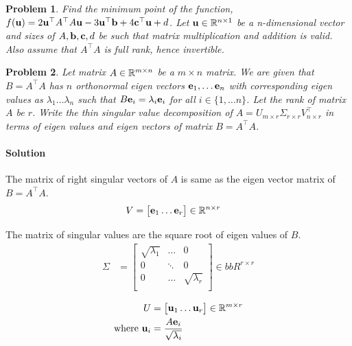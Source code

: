 \documentclass{article}
\newtheorem{prob}{Problem}
\begin{document}
\begin{prob}
  Find the minimum point of the function, $f(\mathbf{u}) = 2 \mathbf{u}^\top A^\top A \mathbf{u} - 3 \mathbf{u}^\top\mathbf{b} +
  4 \mathbf{c}^\top \mathbf{u} + d$. Let $\mathbf{u} \in \mathbb{R}^{n \times 1}$ be a n-dimensional vector and sizes of $A, \mathbf{b}, \mathbf{c}, d$
  be such that matrix multiplication and addition is valid. Also assume that $A^\top A$  is
  full rank, hence invertible.
\end{prob}

\newpage
\begin{prob}
  Let matrix $A \in \mathbb{R}^{m \times n}$ be a $m \times n$ matrix. We are given
  that $B = A^\top A$ has $n$ orthonormal eigen vectors $\mathbf{e}_1, \dots \mathbf{e}_n$ with
  corresponding eigen values as $\lambda_1 \dots \lambda_n$ such that $B\mathbf{e}_i =
  \lambda_i \mathbf{e}_i$ for all $i \in \{1, \dots n\}$. Let the rank of
  matrix $A$ be $r$. Write the thin singular
  value decomposition of $A = U_{m \times r} \Sigma_{r \times r} V^\top_{n
    \times r}$  in terms of eigen values and
  eigen vectors of matrix $B = A^\top A$.
\end{prob}

\newpage
\paragraph*{Solution}
The matrix of right singular vectors of $A$ is same as the eigen vector matrix
of $B = A^\top A$.
\begin{align}
  V &= \begin{bmatrix} \mathbf{e}_1 \dots \mathbf{e}_r \end{bmatrix} \in \mathbb{R}^{n \times r}
\end{align}

The matrix of singular values are the square root of eigen values of $B$.
\begin{align}
  \Sigma &= \begin{bmatrix}
    \sqrt{\lambda_1} & \dots & 0 \\
    0 &  \ddots & 0 \\
    0 & \dots & \sqrt{\lambda_r} \\
    \end{bmatrix} \in bbR^{r \times r}
\end{align}

\begin{align}
  U &= \begin{bmatrix} \mathbf{u}_1 \dots \mathbf{u}_r \end{bmatrix} \in \mathbb{R}^{m \times r}
  \\
  \text{where } \mathbf{u}_i &= \frac{A\mathbf{e}_i}{\sqrt{\lambda_i}}
\end{align}
\newpage
\end{document}
